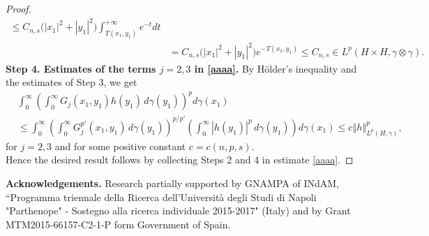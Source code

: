 \documentclass[a4paper,10pt,reqno]{amsart}
\numberwithin{equation}{section}
\begin{document}
\begin{proof}
\begin{align*}
\leq C_{n,s}\big(|x_1|^2+|y_1|^2\big)\int_{T(x_{1},y_{1})}^{+\infty}e^{-t}dt\\
&  =C_{n,s}\big(\left\vert x_{1}\right\vert ^{2}+\left\vert y_{1}\right\vert^{2}\big)
e^{-T(x_{1},y_{1})}\leq C_{n,s}\in L^{p}(H \times H,\gamma\otimes\gamma).
\end{align*}
\noindent\textbf{Step 4. Estimates of the terms $j=2,3$ in \eqref{aaaa}.}
By H\"{o}lder's inequality and the estimates of Step 3, we get
\begin{align*}
&\int_{0}^{\infty}\left(\int_{0}^{\infty}G_{j}(x_{1},y_{1})h(y_{1})\,d\gamma(y_{1})\right)^{p}d\gamma(x_{1})\\
&  \leq\int_{0}^{\infty}\left(\int_{0}^{\infty}G_{j}^{p'}(x_{1},y_{1})\,d\gamma(y_{1})\right)^{p/p'}\left(
\int_{0}^{\infty}|h(y_{1})|^p\,d\gamma(y_{1})\right)d\gamma(x_{1})\leq
c\left\Vert h\right\Vert _{L^{p}(H,\gamma)}^{p},
\end{align*}
for $j=2,3$ and for some positive constant $c=c(n,p,s)$.\\
Hence the desired result follows by collecting Steps 2 and 4 in estimate \eqref{aaaa}.
\end{proof}



\bigskip
\noindent\textbf{Acknowledgements.} Research partially supported by GNAMPA of INdAM, ``Programma
triennale della Ricerca dell'Universit\`{a} degli Studi di Napoli "Parthenope"
- Sostegno alla ricerca individuale 2015-2017" (Italy) and
by Grant MTM2015-66157-C2-1-P form Government of Spain.
\end{document}
